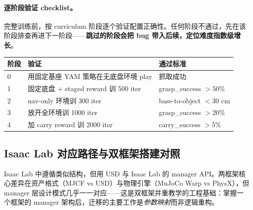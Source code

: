 
\paragraph{逐阶段验证 checklist。}完整训练前，按 curriculum 阶段逐个验证配置正确性。任何阶段不通过，先在该阶段排查再进下一阶段——\textbf{跳过的阶段会把 bug 带入后续，定位难度指数级增长}。

\begin{center}
\small
\begin{tabular}{@{}lll@{}}
\toprule
阶段 & 验证 & 通过标准 \\
\midrule
0 & 用固定基座 YAM 策略在无底盘环境 play & 抓取成功 \\
1 & 固定底盘 + staged reward 训 500 iter & grasp\_success $>50\%$ \\
2 & nav-only 环境训 300 iter & base-to-object $<30$ cm \\
3 & 放开全环境训 1000 iter & grasp\_success $>20\%$ \\
4 & 加 carry reward 训 2000 iter & carry\_success $>5\%$ \\
\bottomrule
\end{tabular}
\end{center}

\subsection{Isaac Lab 对应路径与双框架搭建对照}
\label{sec:rlmc-wh-isaac-integration}

Isaac Lab 中遵循类似结构，但用 USD 与 Isaac Lab 的 manager API。两框架核心差异在资产格式（MJCF vs USD）与物理引擎（MuJoCo Warp vs PhysX），但 manager 层设计模式几乎一一对应——这是双框架并重教学的工程基础：掌握一个框架的 manager 架构后，迁移的主要工作是\emph{参数映射}而非逻辑重构。

